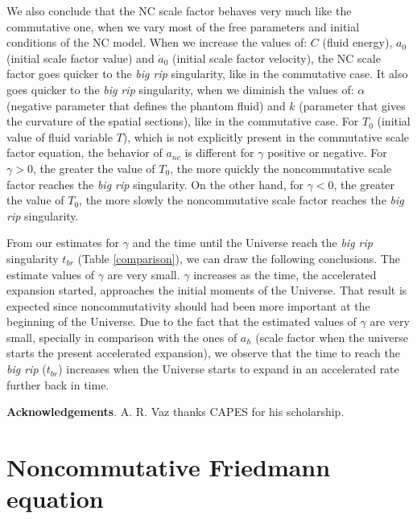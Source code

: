 \documentclass[12pt]{article}
\newcommand{\0}{{(0)}}
\newcommand{\1}{{(1)}}
\newcommand{\2}{{(2)}}
\begin{document}
{We also conclude that the NC scale factor behaves very much like the commutative one, when we vary most of the free
parameters and initial conditions of the NC model. When we increase the values of: $C$ (fluid energy), $a_0$ (initial 
scale factor value) and $\dot{a}_0$ (initial scale factor velocity), the NC scale factor goes quicker to the {\it big 
rip} singularity, like in the commutative case. It also goes quicker to the {\it big rip} singularity, when we diminish the
values of: $\alpha$ (negative parameter that defines the phantom fluid) and $k$ (parameter that gives the curvature of the
spatial sections), like in the commutative case. For $T_0$ (initial value of fluid variable $T$), which is not explicitly 
present in the commutative scale factor equation, the behavior of $a_{nc}$ is different for $\gamma$ positive or negative. 
For $\gamma > 0$, the greater the value of $T_0$, the more quickly the noncommutative scale factor reaches the {\it big rip}
singularity. On the other hand, for $\gamma < 0$, the greater the value of $T_0$, the more slowly the noncommutative scale
factor reaches the {\it big rip} singularity.

From our estimates for $\gamma$ and the time until the Universe reach the {\it big rip} singularity $t_{br}$ (Table \ref{comparison}), 
we can draw the following conclusions. The estimate values of $\gamma$ are very small. $\gamma$ increases 
as the time, the accelerated expansion started, approaches the initial moments of the Universe. That result is expected since
noncommutativity should had been more important at the beginning of the Universe. Due to the fact that the estimated values 
of $\gamma$ are very small, specially in comparison with the ones of $a_h$ (scale factor when the universe starts the present 
accelerated expansion), we observe that the time to reach the {\it big rip} ($t_{br}$) increases when the Universe starts to 
expand in an accelerated rate further back in time. 

{\bf Acknowledgements}. A. R. Vaz thanks CAPES for his scholarship.

\appendix

\section{Noncommutative Friedmann equation}

}
\end{document}
